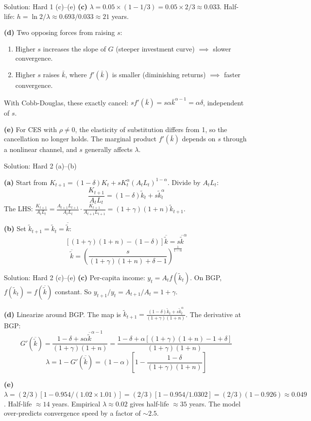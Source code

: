 \documentclass[aspectratio=169,10pt]{beamer}
\newcommand{\backbutton}[1]{\hfill\hyperlink{#1}{\beamerbutton{Back}}}
\begin{document}
\begin{frame}{Solution: Hard 1 (c)--(e)}
\textbf{(c)} $\lambda = 0.05 \times (1-1/3) = 0.05 \times 2/3 \approx 0.033$. Half-life: $h = \ln 2 / \lambda \approx 0.693/0.033 \approx 21$ years.

\medskip
\textbf{(d)} Two opposing forces from raising $s$:
\begin{enumerate}
  \item Higher $s$ increases the slope of $G$ (steeper investment curve) $\implies$ slower convergence.
  \item Higher $s$ raises $\bar{k}$, where $f'(\bar{k})$ is smaller (diminishing returns) $\implies$ faster convergence.
\end{enumerate}
With Cobb-Douglas, these exactly cancel: $sf'(\bar{k}) = s\alpha\bar{k}^{\alpha-1} = \alpha\delta$, independent of $s$.

\medskip
\textbf{(e)} For CES with $\rho \neq 0$, the elasticity of substitution differs from 1, so the cancellation no longer holds. The marginal product $f'(\bar{k})$ depends on $s$ through a nonlinear channel, and $s$ generally affects $\lambda$.
\backbutton{q-h1}
\end{frame}

\begin{frame}{Solution: Hard 2 (a)--(b)}
\hypertarget{s-h2}{}

\textbf{(a)} Start from $K_{t+1} = (1-\delta)K_t + sK_t^\alpha(A_tL_t)^{1-\alpha}$. Divide by $A_tL_t$:
\[
\frac{K_{t+1}}{A_tL_t} = (1-\delta)\tilde{k}_t + s\tilde{k}_t^\alpha
\]
The LHS: $\frac{K_{t+1}}{A_tL_t} = \frac{A_{t+1}L_{t+1}}{A_tL_t}\cdot\frac{K_{t+1}}{A_{t+1}L_{t+1}} = (1+\gamma)(1+n)\tilde{k}_{t+1}$.

\medskip
\textbf{(b)} Set $\tilde{k}_{t+1}=\tilde{k}_t=\overline{\tilde{k}}$:
\[
[(1+\gamma)(1+n)-(1-\delta)]\overline{\tilde{k}} = s\overline{\tilde{k}}^\alpha
\]
\[
\overline{\tilde{k}} = \left(\frac{s}{(1+\gamma)(1+n)+\delta-1}\right)^{\frac{1}{1-\alpha}}
\]
\end{frame}

\begin{frame}{Solution: Hard 2 (c)--(e)}
\textbf{(c)} Per-capita income: $y_t = A_t f(\tilde{k}_t)$. On BGP, $f(\tilde{k}_t) = f(\overline{\tilde{k}})$ constant. So $y_{t+1}/y_t = A_{t+1}/A_t = 1+\gamma$.

\medskip
\textbf{(d)} Linearize around BGP. The map is $\tilde{k}_{t+1} = \frac{(1-\delta)\tilde{k}_t + s\tilde{k}_t^\alpha}{(1+\gamma)(1+n)}$. The derivative at BGP:
\[
G'(\overline{\tilde{k}}) = \frac{1-\delta+s\alpha\overline{\tilde{k}}^{\alpha-1}}{(1+\gamma)(1+n)} = \frac{1-\delta+\alpha[(1+\gamma)(1+n)-1+\delta]}{(1+\gamma)(1+n)}
\]
\[
\lambda = 1 - G'(\overline{\tilde{k}}) = (1-\alpha)\left[1-\frac{1-\delta}{(1+\gamma)(1+n)}\right]
\]

\textbf{(e)} $\lambda = (2/3)[1 - 0.954/(1.02\times1.01)] = (2/3)[1 - 0.954/1.0302] = (2/3)(1-0.926) \approx 0.049$. Half-life $\approx 14$ years. Empirical $\lambda\approx0.02$ gives half-life $\approx 35$ years. The model over-predicts convergence speed by a factor of $\sim 2.5$.
\backbutton{q-h2}
\end{frame}
\end{document}
